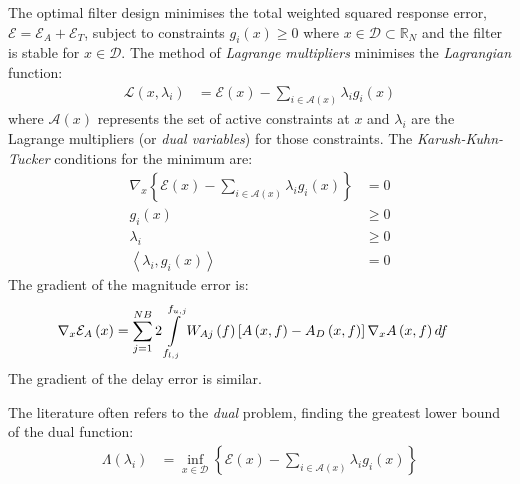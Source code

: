 \documentclass[a4paper,twoside,10pt,english]{report}
\begin{document}
The optimal filter design minimises the total weighted squared response error, 
$\mathcal{E}=\mathcal{E}_{A}+\mathcal{E}_{T}$, subject to constraints 
$g_{i}\left(x\right)\ge 0$ where $x\in\mathcal{D}\subset\mathbb{R}_{N}$ and the
filter is stable for $x\in\mathcal{D}$. The method of 
\emph{Lagrange multipliers} minimises the \emph{Lagrangian} function:
\begin{align*}
\mathcal{L}\left(x,\lambda_{i}\right) &= \mathcal{E}\left(x\right)-
\sum_{i\in\mathcal{A}\left(x\right)}\lambda_{i}g_{i}\left(x\right)
\end{align*}
where $\mathcal{A}\left(x\right)$ represents the set of active constraints
at $x$ and $\lambda_{i}$ are the Lagrange multipliers (or \emph{dual variables})
for those constraints. The \emph{Karush-Kuhn-Tucker} conditions for the minimum
are:
\begin{align}
\nabla_{x}\left\{\mathcal{E}\left(x\right)-
\sum_{i\in\mathcal{A}\left(x\right)}\lambda_{i}g_{i}\left(x\right)\right\} 
&= 0\label{eqn:KKT-cond-1}\\
g_{i}\left(x\right) & \ge 0\label{eqn:KKT-cond-2}\\
\lambda_{i} & \ge 0\\
\left\langle \lambda_{i},g_{i}\left(x\right)\right\rangle  &= 0
\end{align}
The gradient of the magnitude error is:
\begin{align*}
\nabla_{x}\mathcal{E}_{A}\left(x\right) &= 
\sum_{j=1}^{NB}2\intop_{f_{l,j}}^{f_{u,j}}W_{Aj}\left(f\right)\left[A\left(x,f\right)-
A_{D}\left(x,f\right)\right]\nabla_{x}A\left(x,f\right)df
\end{align*}
The gradient of the delay error is similar. 

The literature often refers to the \emph{dual} problem, finding the 
greatest lower bound of the dual function:
\begin{align*}
\Lambda\left(\lambda_{i}\right) &= \inf_{x\in\mathcal{D}}\left\{
\mathcal{E}\left(x\right)-
\sum_{i\in\mathcal{A}\left(x\right)}\lambda_{i}g_{i}\left(x\right)\right\}
\end{align*}
\end{document}
